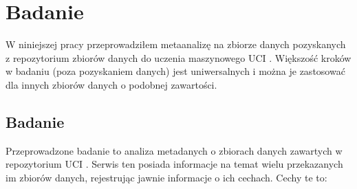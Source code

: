 \chapter{Badanie}

W niniejszej pracy przeprowadziłem metaanalizę na zbiorze danych pozyskanych z repozytorium zbiorów danych do uczenia maszynowego UCI \cite{Dua:2021}.
Większość kroków w badaniu (poza pozyskaniem danych) jest uniwersalnych i można je zastosować dla innych zbiorów danych o podobnej zawartości.

\section{Badanie}

Przeprowadzone badanie to analiza metadanych o zbiorach danych zawartych w repozytorium UCI \cite{Dua:2021}.
Serwis ten posiada informacje na temat wielu przekazanych im zbiorów danych, rejestrując jawnie informacje o ich cechach.
Cechy te to:

